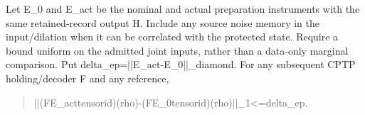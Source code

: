 \documentclass[
]{article}
\begin{document}
Let E\_0 and E\_act be the nominal and actual preparation instruments
with the same retained-record output H. Include any source noise memory
in the input/dilation when it can be correlated with the protected
state. Require a bound uniform on the admitted joint inputs, rather than
a data-only marginal comparison. Put
d\allowbreak{}e\allowbreak{}l\allowbreak{}t\allowbreak{}a\allowbreak{}\_\allowbreak{}e\allowbreak{}p\allowbreak{}=\allowbreak{}|\allowbreak{}|\allowbreak{}E\allowbreak{}\_\allowbreak{}a\allowbreak{}c\allowbreak{}t\allowbreak{}-\allowbreak{}E\allowbreak{}\_\allowbreak{}0\allowbreak{}|\allowbreak{}|\allowbreak{}\_\allowbreak{}d\allowbreak{}i\allowbreak{}a\allowbreak{}m\allowbreak{}o\allowbreak{}n\allowbreak{}d\allowbreak{}.
For any subsequent CPTP
h\allowbreak{}o\allowbreak{}l\allowbreak{}d\allowbreak{}i\allowbreak{}n\allowbreak{}g\allowbreak{}/\allowbreak{}d\allowbreak{}e\allowbreak{}c\allowbreak{}o\allowbreak{}d\allowbreak{}e\allowbreak{}r
F and any reference,

\begin{quote}\small\ttfamily\raggedright\setlength{\parskip}{0pt}
\noindent |\allowbreak{}|\allowbreak{}(\allowbreak{}F\allowbreak{}\hspace*{0.525em}\allowbreak{}E\allowbreak{}\_\allowbreak{}a\allowbreak{}c\allowbreak{}t\allowbreak{}\hspace*{0.525em}\allowbreak{}t\allowbreak{}e\allowbreak{}n\allowbreak{}s\allowbreak{}o\allowbreak{}r\allowbreak{}\hspace*{0.525em}\allowbreak{}i\allowbreak{}d\allowbreak{})\allowbreak{}(\allowbreak{}r\allowbreak{}h\allowbreak{}o\allowbreak{})\allowbreak{}-\allowbreak{}(\allowbreak{}F\allowbreak{}\hspace*{0.525em}\allowbreak{}E\allowbreak{}\_\allowbreak{}0\allowbreak{}\hspace*{0.525em}\allowbreak{}t\allowbreak{}e\allowbreak{}n\allowbreak{}s\allowbreak{}o\allowbreak{}r\allowbreak{}\hspace*{0.525em}\allowbreak{}i\allowbreak{}d\allowbreak{})\allowbreak{}(\allowbreak{}r\allowbreak{}h\allowbreak{}o\allowbreak{})\allowbreak{}|\allowbreak{}|\allowbreak{}\_\allowbreak{}1\allowbreak{}\hspace*{0.525em}\allowbreak{}<\allowbreak{}=\allowbreak{}\hspace*{0.525em}\allowbreak{}d\allowbreak{}e\allowbreak{}l\allowbreak{}t\allowbreak{}a\allowbreak{}\_\allowbreak{}e\allowbreak{}p\allowbreak{}.\par
\end{quote}
\end{document}
